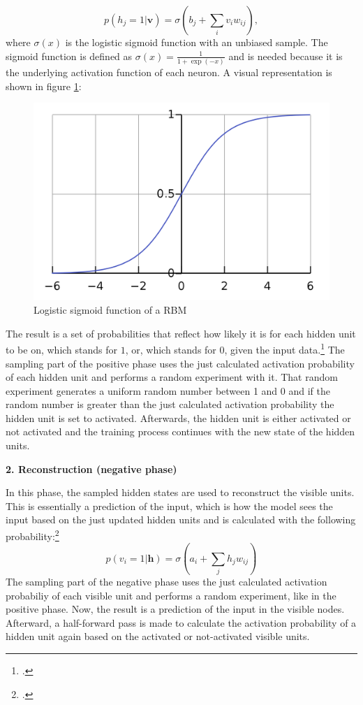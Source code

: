 \begin{equation}
p(h_j = 1 | \textbf{v}) = \sigma(b_j + \sum_i v_i w_{ij}),
\end{equation}
where $\sigma(x)$ is the logistic sigmoid function with an unbiased sample. The sigmoid function is defined as $\sigma(x) = \frac{1}{1 + \exp(-x)}$ and is needed because it is the underlying activation function of each neuron.
A visual representation is shown in figure \ref{logistic_sigmoid}:
\begin{figure}[H]
    \centering
    \includegraphics[width=0.45\linewidth]{graphics/logistic_sigmoid.png}
    \caption{Logistic sigmoid function of a RBM}
    \label{logistic_sigmoid}
\end{figure}
The result is a set of probabilities that reflect how likely it is for each hidden unit to be on, which stands for \( 1 \), or, which stands for \( 0 \), given the input data.\footcite[cf.][6]{huembeliPhysicsEnergybasedModels2022}
The sampling part of the positive phase uses the just calculated activation probability of each hidden unit and performs a random experiment with it.
That random experiment generates a uniform random number between 1 and 0 and if the random number is greater than the just calculated activation probability the hidden unit is set to activated.
Afterwards, the hidden unit is either activated or not activated and the training process continues with the new state of the hidden units.

\textbf{2. Reconstruction (negative phase)}

In this phase, the sampled hidden states are used to reconstruct the visible units. 
This is essentially a prediction of the input, which is how the model sees the input based on the just updated hidden units and is calculated with the following probability:\footcite[cf.][6]{hintonPracticalGuideTraining2012}
\begin{equation}
    p(v_i = 1 | \mathbf{h}) = \sigma(a_i + \sum_j h_j w_{ij})
\end{equation}
The sampling part of the negative phase uses the just calculated activation probabiliy
of each visible unit and performs a random experiment, like in the positive phase.
Now, the result is a prediction of the input in the visible nodes.
Afterward, a half-forward pass is made to calculate the activation probability of a hidden unit again based on the activated or not-activated visible units.

